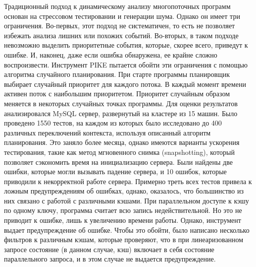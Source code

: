 Традиционный подход к динамическому анализу многопоточных программ основан на стрессовом тестировании и генерации шума. Однако он имеет три ограничения. Во-первых, этот подход не систематичен, то есть не позволяет избежать анализа лишних или похожих событий. Во-вторых, в таком подходе невозможно выделить приоритетные события, которые, скорее всего, приведут к ошибке. И, наконец, даже если ошибка обнаружена, ее крайне сложно воспроизвести.
Инструмент PIKE пытается обойти эти ограничения с помощью алгоритма случайного планирования. При старте программы планировщик выбирает случайный приоритет для каждого потока. В каждый момент времени активен поток с наибольшим приоритетом. Приоритет случайным образом меняется в некоторых случайных точках программы. 
Для оценки результатов анализировался MySQL сервер, развернутый на кластере из 15 машин. Было проведено 1550 тестов, на каждом из которых было исследовано до 400 различных переключений контекста, используя описанный алгоритм планирования. Это заняло более месяца, однако имеются варианты ускорения тестирования, такие как метод мгновенного снимка (snapshotting), который позволяет сэкономить время на инициализацию сервера. Были найдены две ошибки, которые могли вызывать падение сервера, и 10 ошибок, которые приводили к некорректной работе сервера.
Примерно треть всех тестов привела к ложным предупреждениям об ошибках, однако, оказалось, что большинство из них связано с работой с различными кэшами. При параллельном доступе к кэшу по одному ключу, программа считает всю запись недействительной. Но это не приводит к ошибке, лишь к увеличению времени работы. Однако, инструмент выдает предупреждение об ошибке. Чтобы это обойти, было написано несколько фильтров к различным кэшам, которые проверяют, что в при линеаризованном запросе состояние (в данном случае, кэш) включает в себя состояние параллельного запроса, и в этом случае не выдается предупреждение.

